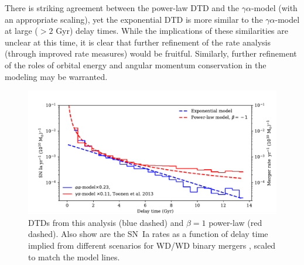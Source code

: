 \documentclass[apj]{aastex62}
\begin{document}
There is striking agreement between the power-law DTD and the $\gamma\alpha$-model (with an appropriate scaling), yet the exponential DTD is more similar to the $\gamma\alpha$-model at large ($>2$ Gyr) delay times. While the implications of these similarities are unclear at this time, it is clear that further refinement of the rate analysis (through improved rate measures) would be fruitful. Similarly, further refinement of the roles of orbital energy and angular momentum conservation in the modeling may be warranted. 

\begin{figure}[t] 
   \centering
   \includegraphics[width=6.1in]{figure_toonen.pdf}
   \caption{\footnotesize DTDs from this analysis (blue dashed) and $\beta=1$ power-law (red dashed). Also show are the SN~Ia rates as a function of delay time implied from different scenarios for WD/WD binary mergers \citep[see][]{Toonen:2013ng}, scaled to match the model lines. }
   \label{fig:toonen}
\end{figure}
\end{document}
